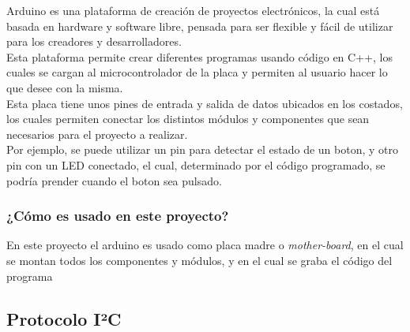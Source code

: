 \documentclass{article}
\begin{document}
		Arduino es una plataforma de creación de proyectos electrónicos,
		la cual está basada en hardware y software libre, pensada para ser flexible y
		fácil de utilizar para los creadores y desarrolladores.\\
		Esta plataforma permite crear diferentes programas usando código en C++,
		los cuales se cargan al microcontrolador de la placa y permiten al usuario hacer
		lo que desee con la misma.\\
		Esta placa tiene unos pines de entrada y salida de datos ubicados en los costados,
		los cuales permiten conectar los distintos módulos y componentes que sean necesarios
		para el proyecto a realizar.\\
		Por ejemplo, se puede utilizar un pin para detectar el estado de un boton,
		y otro pin con un LED conectado, el cual, determinado por el código programado,
		se podría prender cuando el boton sea pulsado.

		\subsubsection{¿Cómo es usado en este proyecto?}
		En este proyecto el arduino es usado como placa madre o \textit{mother-board},
		en el cual se montan todos los componentes y módulos, y en el cual se graba
		el código del programa

	\subsection{Protocolo I²C}
\end{document}

